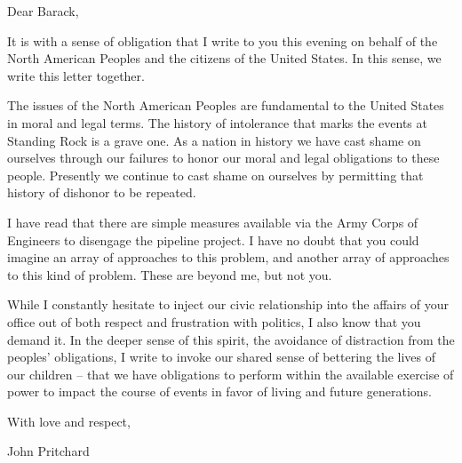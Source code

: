 

Dear Barack,

It is with a sense of obligation that I write to you this evening on
behalf of the North American Peoples and the citizens of the United
States.  In this sense, we write this letter together.

The issues of the North American Peoples are fundamental to the United
States in moral and legal terms.  The history of intolerance that
marks the events at Standing Rock is a grave one.  As a nation in
history we have cast shame on ourselves through our failures to honor
our moral and legal obligations to these people.  Presently we
continue to cast shame on ourselves by permitting that history of
dishonor to be repeated.

I have read that there are simple measures available via the Army
Corps of Engineers to disengage the pipeline project.  I have no doubt
that you could imagine an array of approaches to this problem, and
another array of approaches to this kind of problem.  These are beyond
me, but not you.  

While I constantly hesitate to inject our civic relationship into the
affairs of your office out of both respect and frustration with
politics, I also know that you demand it.  In the deeper sense of this
spirit, the avoidance of distraction from the peoples' obligations, I
write to invoke our shared sense of bettering the lives of our
children -- that we have obligations to perform within the available
exercise of power to impact the course of events in favor of living
and future generations.

With love and respect,

John Pritchard

\bye

